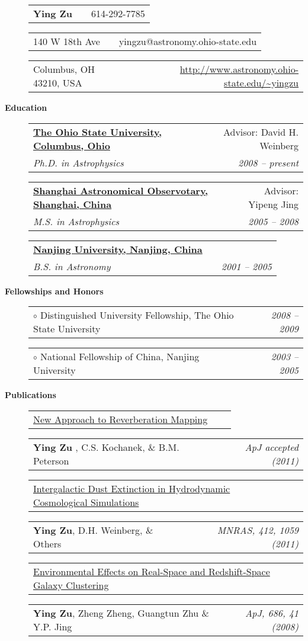 \documentclass[letterpaper,12pt]{article}
\makeatletter
\newcommand{\resheading}[1]{{\large
\colorbox{mygrey}{\begin{minipage}{6.5in}{\textbf{#1
    \vphantom{p\^{E}}}}\end{minipage}}}}
\newcommand{\toast}[2]{
 \begin{tabular*}{6.5in}{lr@{\extracolsep{\fill}}r} 
     #1          &             &           #2\\
 \end{tabular*}
 \vspace{-6pt}
}
\newcommand{\sandwich}[4]{
 \begin{tabular*}{6.5in}{lr@{\extracolsep{\fill}}r} 
     \textbf{#1} &             &           #2\\
     \textit{#3} &             & \textit{#4} \\ 
 \end{tabular*}
 \vspace{-6pt}
}
\makeatother
\begin{document}
\begin{description}
    \item[]\toast{\textbf{\large Ying Zu}}{614-292-7785}
    \item[]\toast{140 W 18th Ave}{yingzu@astronomy.ohio-state.edu}
    \item[]\toast{Columbus, OH 43210, USA}
        {\href{http://www.astronomy.ohio-state.edu/~yingzu}{\url{http://www.astronomy.ohio-state.edu/~yingzu}}}

\end{description}
\resheading{Education}
\begin{description}
    \item[]\sandwich{\href{http://www.astronomy.ohio-state.edu}{The Ohio State
    University, Columbus, Ohio}}{Advisor: David H. Weinberg }{Ph.D. in
    Astrophysics}{2008 -- present}
    \item[]\sandwich{\href{http://www.shao.ac.cn}{Shanghai Astronomical
    Observotary, Shanghai, China}}{Advisor: Yipeng Jing }{M.S. in
    Astrophysics}{2005 -- 2008}
    \item[]\sandwich{\href{http://www.nju.edu.cn}{Nanjing University, Nanjing,
    China}}{ }{B.S. in Astronomy}{2001 -- 2005}
\end{description}
\resheading{Fellowships and Honors}
\begin{description}
    \item[]\toast{$\circ$ Distinguished University Fellowship, The Ohio State
        University}{\textit{2008 -- 2009}}
    \item[]\toast{$\circ$ National Fellowship of China, Nanjing University }
        {\textit{2003 -- 2005}}
\end{description}
\resheading{Publications}
\begin{description}
\item[]\toast{\href{http://arxiv.org/abs/1008.0641}{New Approach to Reverberation
    Mapping}}{}
\item[]\toast{{\bf Ying Zu} , C.S. Kochanek, \& B.M. Peterson}{\emph{ApJ accepted (2011)}}
\item[]\toast{\href{http://arxiv.org/abs/1005.4406}{Intergalactic Dust
    Extinction in Hydrodynamic Cosmological Simulations}}{}
\item[]\toast{{\bf Ying Zu}, D.H. Weinberg, \& Others}{\emph{MNRAS, 412, 1059 (2011)}}
\item[]\toast{\href{http://arxiv.org/abs/0712.3570}{Environmental Effects on
    Real-Space and Redshift-Space Galaxy Clustering}}{}
\item[]\toast{{\bf Ying Zu}, Zheng
    Zheng, Guangtun Zhu \& Y.P. Jing}{\emph{ApJ, 686, 41 (2008)}}
\end{description}
\end{document}
